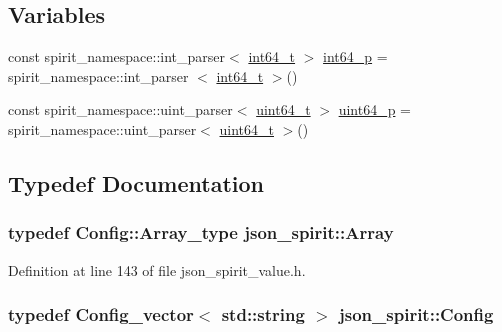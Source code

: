 \subsection*{Variables}
\begin{DoxyCompactItemize}
\item 
const spirit\+\_\+namespace\+::int\+\_\+parser$<$ \hyperlink{stdint_8h_adec1df1b8b51cb32b77e5b86fff46471}{int64\+\_\+t} $>$ \hyperlink{namespacejson__spirit_a535c3aa28f9c7a6ff7493e31141b3175}{int64\+\_\+p} = spirit\+\_\+namespace\+::int\+\_\+parser $<$ \hyperlink{stdint_8h_adec1df1b8b51cb32b77e5b86fff46471}{int64\+\_\+t} $>$()
\item 
const spirit\+\_\+namespace\+::uint\+\_\+parser$<$ \hyperlink{stdint_8h_aaa5d1cd013383c889537491c3cfd9aad}{uint64\+\_\+t} $>$ \hyperlink{namespacejson__spirit_a316b07479099fbe08a190f1a44707c85}{uint64\+\_\+p} = spirit\+\_\+namespace\+::uint\+\_\+parser$<$ \hyperlink{stdint_8h_aaa5d1cd013383c889537491c3cfd9aad}{uint64\+\_\+t} $>$()
\end{DoxyCompactItemize}


\subsection{Typedef Documentation}
\hypertarget{namespacejson__spirit_aee299e52bda3816039a53210cbbfea1a}{}
\subsubsection[{Array}]{\setlength{\rightskip}{0pt plus 5cm}typedef {\bf Config\+::\+Array\+\_\+type} {\bf json\+\_\+spirit\+::\+Array}}\label{namespacejson__spirit_aee299e52bda3816039a53210cbbfea1a}


Definition at line 143 of file json\+\_\+spirit\+\_\+value.\+h.

\hypertarget{namespacejson__spirit_aaf9079ef41a2fa7db0861c24b89d4254}{}
\subsubsection[{Config}]{\setlength{\rightskip}{0pt plus 5cm}typedef {\bf Config\+\_\+vector}$<$ std\+::string $>$ {\bf json\+\_\+spirit\+::\+Config}}\label{namespacejson__spirit_aaf9079ef41a2fa7db0861c24b89d4254}



